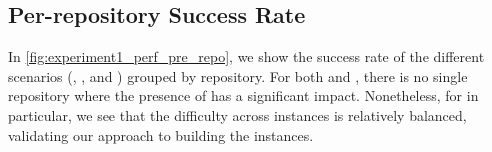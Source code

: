 \subsection{Per-repository Success Rate}

In \cref{fig:experiment1_perf_pre_repo}, we show the success rate of the different scenarios (\noplan{}, \autoplan{}, and \humanplan{}) grouped by repository.
For both \swebench{} and \planbench{}, there is no single repository where the presence of \agentsmds{} has a significant impact.
Nonetheless, for \planbench{} in particular, we see that the difficulty across instances is relatively balanced, validating our approach to building the instances.
\vspace{-0.1in}

